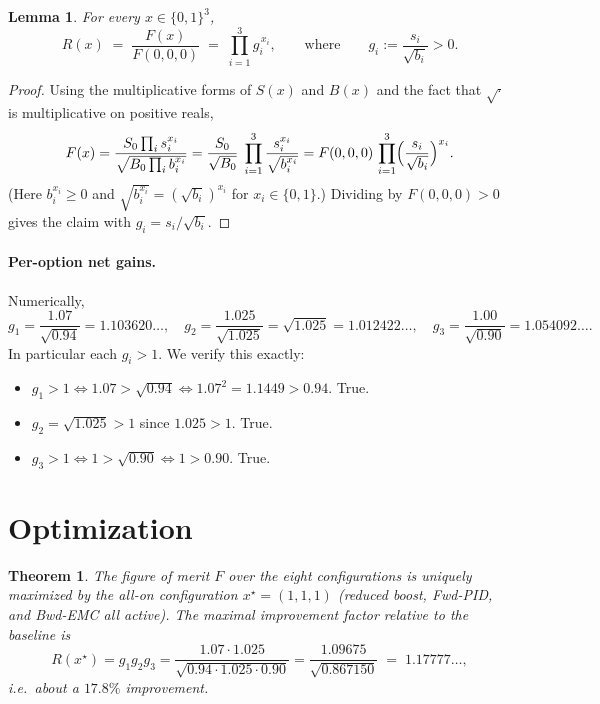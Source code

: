 \documentclass{amsart}
\newtheorem{theorem}{Theorem}
\newtheorem{lemma}{Lemma}
\begin{document}
\begin{lemma}\label{lem:decomp}
For every $x\in\{0,1\}^3$,
\[
R(x)\;=\;\frac{F(x)}{F(0,0,0)}\;=\;\prod_{i=1}^{3}g_i^{\,x_i},
\qquad\text{where}\qquad
g_i:=\frac{s_i}{\sqrt{b_i}}>0 .
\]
\end{lemma}

\begin{proof}
Using the multiplicative forms of $S(x)$ and $B(x)$ and the fact that
$\sqrt{\cdot}$ is multiplicative on positive reals,
\[
F(x)=\frac{S_0\prod_i s_i^{x_i}}{\sqrt{B_0\prod_i b_i^{x_i}}}
=\frac{S_0}{\sqrt{B_0}}\;\prod_{i=1}^{3}\frac{s_i^{x_i}}{\sqrt{b_i^{x_i}}}
=F(0,0,0)\,\prod_{i=1}^{3}\Bigl(\frac{s_i}{\sqrt{b_i}}\Bigr)^{x_i}.
\]
(Here $b_i^{x_i}\ge 0$ and $\sqrt{b_i^{x_i}}=(\sqrt{b_i})^{x_i}$ for
$x_i\in\{0,1\}$.) Dividing by $F(0,0,0)>0$ gives the claim with
$g_i=s_i/\sqrt{b_i}$.
\end{proof}

\paragraph{Per-option net gains.}
Numerically,
\[
g_1=\frac{1.07}{\sqrt{0.94}}=1.103620\ldots,\quad
g_2=\frac{1.025}{\sqrt{1.025}}=\sqrt{1.025}=1.012422\ldots,\quad
g_3=\frac{1.00}{\sqrt{0.90}}=1.054092\ldots .
\]
In particular each $g_i>1$. We verify this exactly:
\begin{itemize}
\item $g_1>1 \iff 1.07>\sqrt{0.94} \iff 1.07^2=1.1449>0.94$. True.
\item $g_2=\sqrt{1.025}>1$ since $1.025>1$. True.
\item $g_3>1 \iff 1>\sqrt{0.90} \iff 1>0.90$. True.
\end{itemize}

\section*{Optimization}

\begin{theorem}\label{thm:main}
The figure of merit $F$ over the eight configurations is uniquely maximized by
the all-on configuration $x^\star=(1,1,1)$ (reduced boost, Fwd-PID, and
Bwd-EMC all active). The maximal improvement factor relative to the baseline is
\[
R(x^\star)=g_1g_2g_3
=\frac{1.07\cdot 1.025}{\sqrt{0.94\cdot 1.025\cdot 0.90}}
=\frac{1.09675}{\sqrt{0.867150}}\;=\;1.17777\ldots,
\]
i.e.\ about a $17.8\%$ improvement.
\end{theorem}
\end{document}
